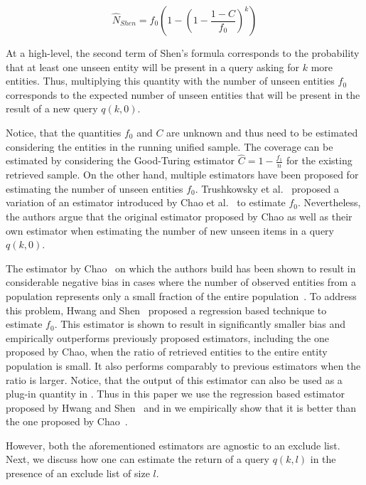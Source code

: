 \begin{equation}
\label{eq:shen}
\hat{N}_{Shen} = f_0\left( 1 - \left(1 - \frac{1 - C}{f_0}\right)^k\right)
\end{equation}

At a high-level, the second term of Shen's formula corresponds to the probability that at least one unseen entity will be present in a query asking for $k$ more entities. Thus, multiplying this quantity with the number of unseen entities $f_0$ corresponds to the expected number of unseen entities that will be present in the result of a new query $q(k,0)$.

Notice, that the quantities $f_0$ and $C$ are unknown and thus need to be estimated considering the entities in the running unified sample. The coverage can be estimated by considering the Good-Turing estimator $\hat{C} = 1 - \frac{f_1}{n}$ for the existing retrieved sample. On the other hand, multiple estimators have been proposed for estimating the number of unseen entities $f_0$. Trushkowsky et al.~\cite{trushkowsky:2013} proposed a variation of an estimator introduced by Chao et al.~\cite{chao:1992} to estimate $f_0$. Nevertheless, the authors argue that the original estimator proposed by Chao as well as their own estimator when estimating  the number of new unseen items in a query $q(k,0)$.

The estimator by Chao~\cite{chao:1992} on which the authors build has been shown to result in considerable negative bias in cases where the number of observed entities from a population represents only a small fraction of the entire population~\cite{hwang:2010}. To address this problem, Hwang and Shen~\cite{hwang:2010} proposed a regression based technique to estimate $f_0$. This estimator is shown to result in significantly smaller bias and empirically outperforms previously proposed estimators, including the one proposed by Chao, when the ratio of retrieved entities to the entire entity population is small. It also performs comparably to previous estimators when the ratio is larger. Notice, that the output of this estimator can also be used as a plug-in quantity in . 
Thus in this paper we use the regression based estimator proposed by Hwang and Shen~\cite{hwang:2010} and in  we empirically show that it is better than the one proposed by Chao~\cite{chao:1992}.

However, both the aforementioned estimators are agnostic to an exclude list. Next, we discuss how one can estimate the return of a query $q(k,l)$ in the presence of an exclude list of size $l$.
